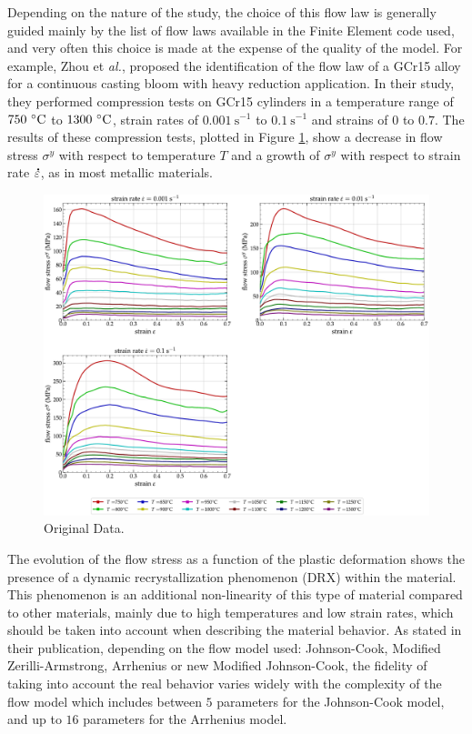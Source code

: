 \documentclass[algorithms,article,submit,pdftex,moreauthors]{Definitions/mdpi}
\makeatletter
\DeclareRobustCommand{\mdot}[1]{\accentset{\mbox{\bfseries .}}{#1}}
\DeclareRobustCommand{\eal}{et \emph{al.}\@\xspace}
\DeclareRobustCommand{\ps}{\text{s}^{-1}}
\makeatother
\begin{document}
Depending on the nature of the study, the choice of this flow law is generally guided mainly by the list of flow laws available in the Finite Element code used, and very often this choice is made at the expense of the quality of the model.
For example, Zhou \eal \cite{Zhou-2019}, proposed the identification of the flow law of a GCr15 alloy for a continuous casting bloom with heavy reduction application.
In their study, they performed compression tests on GCr15 cylinders in a temperature range of $750~\celsius$ to $1300~\celsius$, strain rates of $0.001~\ps$ to $0.1~\ps$ and strains of $0$ to $0.7$.
The results of these compression tests, plotted in Figure \ref{fig:Zhou-OriginalData}, show a decrease in flow stress $\sigma^y$ with respect to temperature $T$ and a growth of $\sigma^y$ with respect to strain rate $\mdot\varepsilon$, as in most metallic materials.
\begin{figure}[!ht]
\centering
\includegraphics[width=0.9\columnwidth]{Figures/Zhou-OriginalData}
\caption{Original Data.}
\label{fig:Zhou-OriginalData}
\end{figure}
The evolution of the flow stress as a function of the plastic deformation shows the presence of a dynamic recrystallization phenomenon (DRX) within the material.
This phenomenon is an additional non-linearity of this type of material compared to other materials, mainly due to high temperatures and low strain rates, which should be taken into account when describing the material behavior.
As stated in their publication, depending on the flow model used: Johnson-Cook, Modified Zerilli-Armstrong, Arrhenius or new Modified Johnson-Cook, the fidelity of taking into account the real behavior varies widely with the complexity of the flow model which includes between $5$ parameters for the Johnson-Cook model, and up to $16$ parameters for the Arrhenius model.
\end{document}

